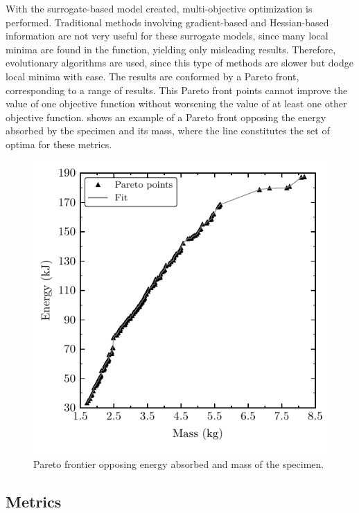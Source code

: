 \documentclass[cmfonts]{witpress}
\begin{document}
With the surrogate-based model created, multi-objective optimization is performed. Traditional methods involving gradient-based and Hessian-based information are not very useful for these surrogate models, since many local minima are found in the function, yielding only misleading results. Therefore, evolutionary algorithms are used, since this type of methods are slower but dodge local minima with ease. The results are conformed by a Pareto front, corresponding to a range of results. This Pareto front points cannot improve the value of one objective function without worsening the value of at least one other objective function.  shows an example of a Pareto front opposing the energy absorbed by the specimen and its mass, where the line constitutes the set of optima for these metrics.

\begin{figure}[htpb]
  \centering
   \includegraphics[width=.8\columnwidth]{figures/IMG/Pareto}
  \caption{Pareto frontier opposing energy absorbed and mass of the specimen.}
  \label{fig:Pareto}
\end{figure}


\subsection{Metrics}
\end{document}
